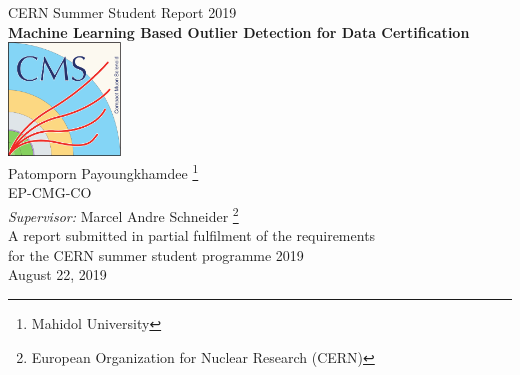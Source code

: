 \documentclass[11pt,oneside]{book}
\begin{document}

\frontmatter

\begin{titlepage}




\begin{center}
{\LARGE CERN Summer Student Report 2019}\\[1.5cm]
\linespread{1.2}\huge {\bfseries Machine Learning Based Outlier Detection for Data Certification}\\[1.5cm]
\linespread{1}
\includegraphics[width=3cm]{images/CMS_logo_May2014-eps-converted-to.pdf}\\[1cm]
{\Large Patomporn Payoungkhamdee \footnote{Mahidol University} \\ EP-CMG-CO}\\[1cm]
{\large \emph{Supervisor:} Marcel Andre Schneider \footnote{European Organization for Nuclear Research (CERN)}}\\[1cm]
\large A report submitted in partial fulfilment of the requirements\\ for the CERN summer student programme 2019 \\[2cm] 
August 22, 2019
\end{center}

\end{titlepage}


\end{document}
